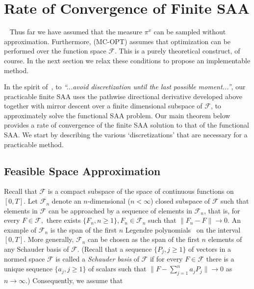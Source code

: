 \documentclass[11pt,leqno]{amsart}
\begin{document}
\section{{Rate of Convergence of Finite SAA}}~\label{sec:rate}
Thus far we have assumed that the measure $\pi^x$ can be sampled without approximation. Furthermore, (MC-OPT) assumes that optimization can be performed over the function space $\mathcal F$. This is a purely theoretical construct, of course. In the next section we relax these conditions to propose an implementable method.

In the spirit of~\citep{stuart2010inverse}, to \textit{``...avoid discretization until the last possible moment...''}, our practicable finite SAA uses the pathwise directional derivative developed above together with mirror descent over a finite dimensional subspace of $\mathcal{F}$, to approximately solve the functional SAA problem. Our main theorem below provides a rate of convergence of the finite SAA solution to that of the functional SAA. We start by describing the various `discretizations' that are necessary for a practicable method.

\subsection{Feasible Space Approximation}
Recall that $\mathcal{F}$ is a compact subspace of the space of continuous functions on $[0,T]$. Let $\mathcal{F}_n$ denote an $n$-dimensional ($n < \infty$) closed subspace of $\mathcal{F}$ such that elements in $\mathcal{F}$ can be approached by a sequence of elements in $\mathcal{F}_n$, that is, for every $F \in \mathcal{F},$ there exists $\{F_n, n \geq 1\}, F_n \in \mathcal{F}_n$ such that $\|F_n -F\| \to 0$. An example of $\mathcal F_n$ is the span of the first $n$ Legendre polynomials~\citep[pp. 176]{1989kre} on the interval $[0,T]$. More generally, $\mathcal{F}_n$ can be chosen as the span of the first $n$ elements of any Schauder basis of $\mathcal{F}$. (Recall that a sequence $\{P_j, j \geq 1\}$ of vectors in a normed space $\mathcal{F}$ is called a \emph{Schauder basis} of $\mathcal{F}$ if for every $F\in \mathcal F$ there is a unique sequence $\{a_j, j \geq 1\}$ of scalars such that $\|F - \sum_{j=1}^{n} a_j P_j \| \to 0$ as $n \to \infty$.) Consequently, we assume that
\end{document}
